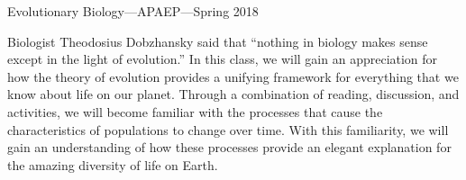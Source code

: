 



\setlength{\parindent}{0.25in}

\begin{mytitle}
    Evolutionary Biology---APAEP---Spring 2018
\end{mytitle}

\bigskip

Biologist Theodosius Dobzhansky said that ``nothing in biology makes sense
except in the light of evolution.''
In this class, we will gain an appreciation for how the theory of evolution
provides a unifying framework for everything that we know about life on our
planet.
Through a combination of reading, discussion, and activities, we will become
familiar with the processes that cause the characteristics of populations to
change over time.
With this familiarity, we will gain an understanding of how these processes
provide an elegant explanation for the amazing diversity of life on Earth.



